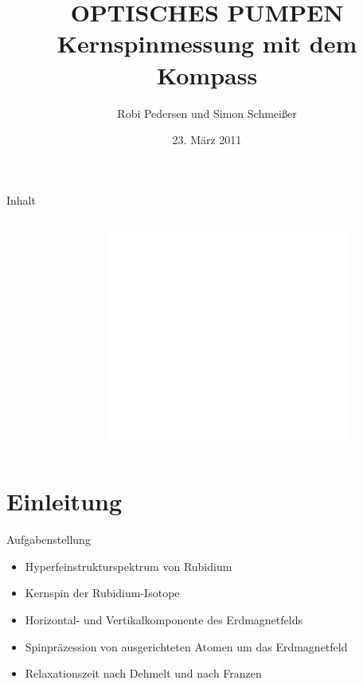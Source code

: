 \documentclass{beamer}
\title[Optisches Pumpen]{OPTISCHES PUMPEN \\ Kernspinmessung mit dem Kompass}
\author{Robi Pedersen und Simon Schmeißer}
\institute{Albert-Ludwigs-Universität Freiburg}
\date{23. März 2011}
\begin{document}
\begin{frame}
\titlepage
\end{frame}

\begin{frame}[t, shrink]{Inhalt}
\begin{columns}
\begin{column}[b]{6cm}
\tableofcontents[sections = {1-4}]
\end{column}
\begin{column}[b]{4cm}
\tableofcontents[sections = {5-7}]
\centering \includegraphics[width = 0.8\textwidth]{Bilder/leer.png}
\end{column}
\end{columns}
\end{frame}


\section{Einleitung}

\begin{frame}{Aufgabenstellung} %
\begin{itemize}
\item Hyperfeinstrukturspektrum von Rubidium
\item Kernspin der Rubidium-Isotope
\item Horizontal- und Vertikalkomponente des Erdmagnetfelds
\item Spinpräzession von ausgerichteten Atomen um das Erdmagnetfeld
\item Relaxationszeit nach Dehmelt und nach Franzen 
\end{itemize}
\end{frame}
\end{document}
